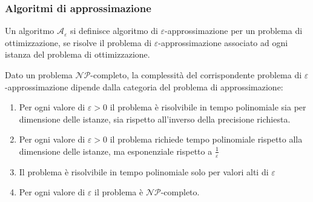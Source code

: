 \documentclass[../template]{subfiles}
\begin{document}
\subsubsection{Algoritmi di approssimazione}
Un algoritmo $\mathcal{A}_\varepsilon$ si definisce algoritmo di $\varepsilon$-approssimazione per un problema di ottimizzazione, se risolve il problema di $\varepsilon$-approssimazione associato ad ogni istanza del problema di ottimizzazione.


Dato un problema $\mathcal{NP}$-completo, la complessità del corrispondente problema di $\varepsilon$-approssimazione dipende dalla categoria del problema di approssimazione:
\begin{enumerate}
    \item Per ogni valore di $\varepsilon > 0$ il problema è risolvibile in tempo polinomiale sia per dimensione delle istanze, sia rispetto all'inverso della precisione richiesta.
    \item Per ogni valore di $\varepsilon > 0$ il problema richiede tempo polinomiale rispetto alla dimensione delle istanze, ma esponenziale rispetto a $\frac{1}{\varepsilon}$
    \item Il problema è risolvibile in tempo polinomiale solo per valori alti di $\varepsilon$
    \item Per ogni valore di $\varepsilon$ il problema è $\mathcal{NP}$-completo.
\end{enumerate}
\end{document}

